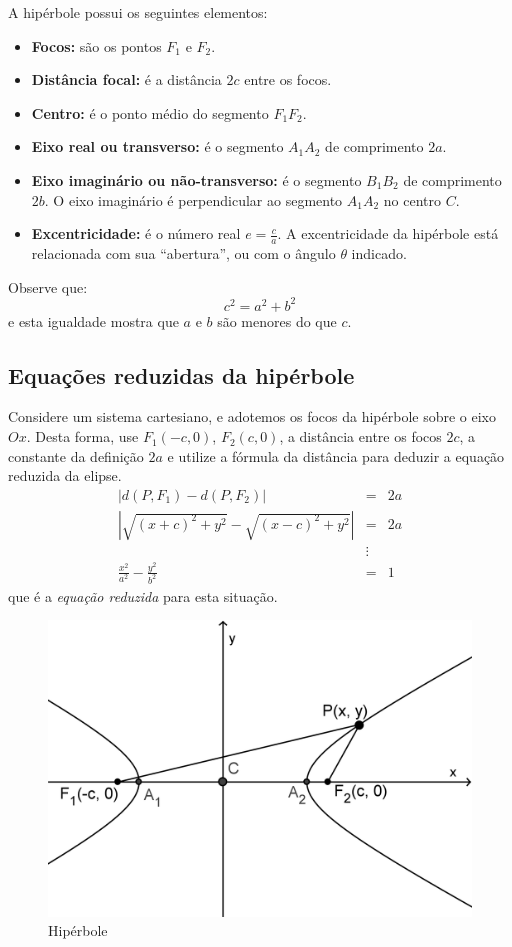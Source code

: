 A hipérbole possui os seguintes elementos:
\begin{itemize}
  \item \textbf{Focos:} são os pontos $F_1$ e $F_2$.
  \item \textbf{Distância focal:} é a distância $2c$ entre os focos.
  \item \textbf{Centro:} é o ponto médio do segmento $F_1F_2$.
  \item \textbf{Eixo real ou transverso:} é o segmento $A_1A_2$ de comprimento $2a$.
  \item \textbf{Eixo imaginário ou não-transverso:} é o segmento $B_1B_2$ de comprimento $2b$. O eixo imaginário é perpendicular ao segmento $A_1A_2$ no centro $C$.
  \item \textbf{Excentricidade:} é o número real $\displaystyle e=\frac{c}{a}$. A excentricidade da hipérbole está relacionada com sua ``abertura'', ou com o ângulo $\theta$ indicado.
\end{itemize}
Observe que: $$c^2=a^2+b^2$$ e esta igualdade mostra que $a$ e $b$ são menores do que $c$.

\subsection{Equações reduzidas da hipérbole}

Considere um sistema cartesiano, e adotemos os focos da hipérbole sobre o eixo $Ox$. Desta forma, use $F_1(-c, 0)$, $F_2(c,0)$, a distância entre os focos $2c$, a constante da definição $2a$ e utilize a fórmula da distância para deduzir a equação reduzida da elipse.
\begin{eqnarray*}
|d(P, F_1)-d(P, F_2)|&=&2a \\
\left| \sqrt{(x+c)^2+y^2} - \sqrt{(x-c)^2+y^2}\right| & = & 2a  \\
&\vdots &\\
\frac{x^2}{a^2}-\frac{y^2}{b^2}& =& 1
\end{eqnarray*}
que é a \textit{equação reduzida} para esta situação.

\begin{figure}[H]
\centering
\includegraphics[width=0.45\linewidth]{analitica/imagens/hiperboleh3.png}
\caption{Hipérbole}
\label{fig:hiperh3}
\end{figure}


